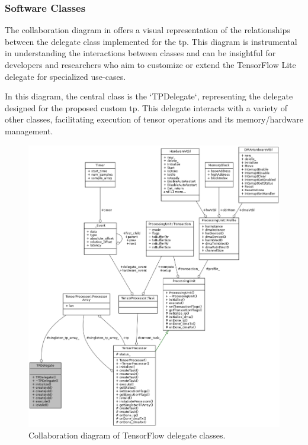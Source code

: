 \subsubsection{Software Classes}

The collaboration diagram in  offers a visual representation of the relationships between the delegate class implemented for the \gls{tp}. This diagram is instrumental in understanding the interactions between classes and can be insightful for developers and researchers who aim to customize or extend the TensorFlow Lite delegate for specialized use-cases.

In this diagram, the central class is the `TPDelegate`, representing the delegate designed for the proposed custom \gls{tp}. This delegate interacts with a variety of other classes, facilitating execution of tensor operations and its memory/hardware management.

\begin{figure}[h!]
	\centering
	\includegraphics[width=\textwidth]{./figures/class_t_p_delegate__coll__graph.png}
	\caption{Collaboration diagram of TensorFlow delegate classes.}
	\label{fig:sw_tp_delegate}
\end{figure}
\FloatBarrier
